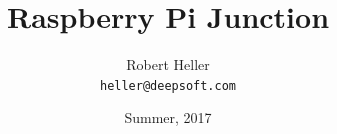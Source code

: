 
\usepackage[english]{babel}

\usepackage[latin1]{inputenc}

\usepackage{times}
\usepackage[T1]{fontenc}
\usepackage{graphicx}

\title{Raspberry Pi Junction}


\author{Robert Heller \\ \texttt{heller@deepsoft.com}}


\date{Summer, 2017}














\begin{frame}
  \titlepage
\end{frame}



